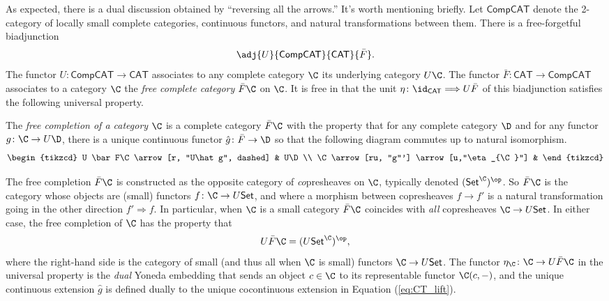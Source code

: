 As expected, there is a dual discussion obtained by ``reversing all the arrows.'' It's worth mentioning briefly. Let $\mathsf{CompCAT}$ denote the 2-category of locally small complete categories, continuous functors, and natural transformations between them. There is a free-forgetful biadjunction 
\[\adj{U}{\mathsf{CompCAT}}{\mathsf{CAT}}{\bar F}.\]
The functor $U\colon \mathsf{CompCAT}\to \mathsf{CAT}$ associates to any complete category $\C$ its underlying category $U\C$. The functor $\bar F\colon \mathsf{CAT}\to\mathsf{CompCAT}$ associates to a category $\C$ the \emph{free complete category} $\bar F\C$ on $\C$. It is free in that the unit $\eta\colon \id_{\mathsf{CAT}}\Longrightarrow U\bar F$ of this biadjunction satisfies the following universal property.

\begin{UP_complete}The \textit{free completion of a category $\C$} is a complete category $\bar F\C$ with the property that for any complete category $\D$ and for any functor $g\colon \C\to U\D$, there is a unique continuous functor $\hat g\colon \bar F\to \D$ so that the following diagram commutes up to natural isomorphism.
\[
  \begin{tikzcd}
  U \bar F\C \arrow[r, "U\hat g", dashed] & U\D \\
  \C \arrow[ru, "g"'] \arrow[u,"\eta_{\C}"]                 &   
  \end{tikzcd}
\]
\end{UP_complete}
\noindent The free completion $\bar F\C$ is constructed as the opposite category of \textit{co}presheaves on $\C$, typically denoted $(\mathsf{Set}^{\C})^{\op}$. So $\bar F \C$ is the category whose objects are (small) functors $f\colon \C\to U\mathsf{Set}$, and where a morphism between copresheaves $f\to f'$ is a natural transformation going in the other direction $f'\Longrightarrow f.$  In particular, when $\C$ is a small category $\bar F\C$ coincides with \textit{all} copresheaves $\C\to U\mathsf{Set}$. In either case, the free completion of $\C$ has the property that 
\[ U\bar F \C = (U\mathsf{Set}^{\C})^{\op},\]
where the right-hand side is the category of small (and thus all when $\C$ is small) functors $\C\to U\mathsf{Set}$. The functor $\eta_{\C}\colon \C\to U\bar F\C$ in the universal property is the \textit{dual} Yoneda embedding that sends an object $c\in \C$ to its representable functor $\C(c,-)$, and the unique continuous extension $\hat g$ is defined dually to the unique cocontinuous extension in Equation (\ref{eq:CT_lift}).

